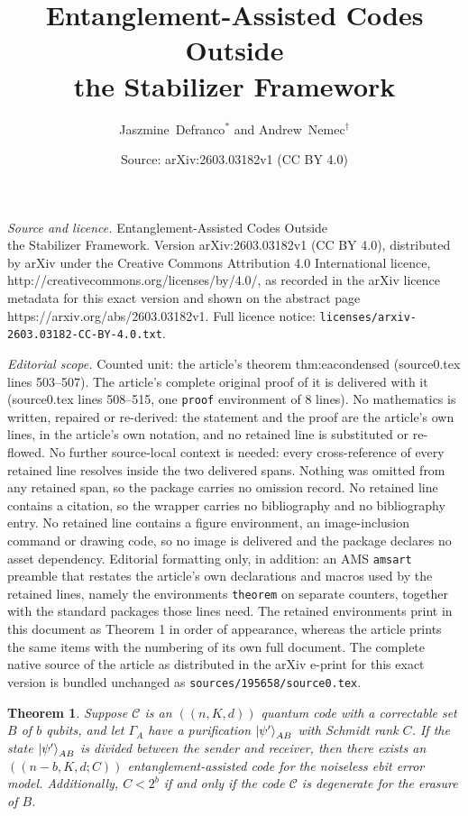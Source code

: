 \documentclass[10pt,a4paper]{amsart}
\title{Entanglement-Assisted Codes Outside\\the Stabilizer Framework}
\author{Jaszmine~Defranco$^*$ and Andrew~Nemec$^\dagger$}
\date{Source: arXiv:2603.03182v1 (CC BY 4.0)}
\newtheorem{theorem}{Theorem}
\begin{document}
\maketitle

\noindent\emph{Source and licence.} Entanglement-Assisted Codes Outside\\the Stabilizer Framework. Version arXiv:2603.03182v1 (CC BY 4.0), distributed by arXiv under the Creative Commons Attribution 4.0 International licence, http://creativecommons.org/licenses/by/4.0/, as recorded in the arXiv licence metadata for this exact version and shown on the abstract page https://arxiv.org/abs/2603.03182v1. Full licence notice: \texttt{licenses/arxiv-2603.03182-CC-BY-4.0.txt}.\par\smallskip

\noindent\textit{Editorial scope.} Counted unit: the article's theorem thm:eacondensed (source0.tex lines 503--507). The article's complete original proof of it is delivered with it (source0.tex lines 508--515, one \texttt{proof} environment of 8 lines). No mathematics is written, repaired or re-derived: the statement and the proof are the article's own lines, in the article's own notation, and no retained line is substituted or re-flowed.  No further source-local context is needed: every cross-reference of every retained line resolves inside the two delivered spans.  Nothing was omitted from any retained span, so the package carries no omission record.  No retained line contains a citation, so the wrapper carries no bibliography and no bibliography entry.  No retained line contains a figure environment, an image-inclusion command or drawing code, so no image is delivered and the package declares no asset dependency.  Editorial formatting only, in addition: an AMS \texttt{amsart} preamble that restates the article's own declarations and macros used by the retained lines, namely the environments \texttt{theorem} on separate counters, together with the standard packages those lines need.  The retained environments print in this document as Theorem 1 in order of appearance, whereas the article prints the same items with the numbering of its own full document.  The complete native source of the article as distributed in the arXiv e-print for this exact version is bundled unchanged as \texttt{sources/195658/source0.tex}.
\begin{theorem}\label{thm:eacondensed}
    Suppose $\mathcal{C}$ is an $\left(\!\left(n,K,d\right)\!\right)$ quantum code with a correctable set $B$ of $b$ qubits, and let $\Gamma_A$ have a purification $\ket{\psi'}_{AB}$ with Schmidt rank $C$.
    If the state $\ket{\psi'}_{AB}$ is divided between the sender and receiver, then there exists an $\left(\!\left(n-b,K,d;C\right)\!\right)$ entanglement-assisted code for the noiseless ebit error model.
    Additionally, $C<2^b$ if and only if the code $\mathcal{C}$ is degenerate for the erasure of $B$.
\end{theorem}
\end{document}
